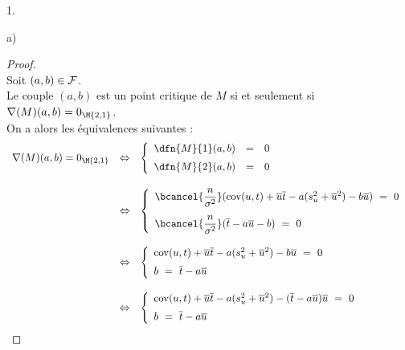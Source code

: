 \begin{noliste}{1.}
\begin{noliste}{a)}
  \begin{proof}~\\
   Soit $(a,b) \in {\cal F}$.\\
   Le couple $(a,b)$ est un point critique de $M$ si et 
    seulement si $\nabla(M)(a,b) = 0_{\M{2,1}}$.\\
    On a alors les équivalences suivantes :
    \[
     \begin{array}{rcl}
      \nabla(M)(a,b) = 0_{\M{2,1}} & \Leftrightarrow &
      \left\{
      \begin{array}{rcl}
        \dfn{M}{1}(a,b) &=& 0\\[.2cm]
        \dfn{M}{2}(a,b) &=& 0
      \end{array}
    \right. 
    \\[.8cm]
    & \Leftrightarrow &
    \left\{
      \begin{array}{l}
        \bcancel{\dfrac{n}{\sigma^2}}(\text{cov}(u,t) + 
	\overline{u}\overline{t} - a(s_u^2 + 
	\overline{u}^2)-b\overline{u}) \ = \ 0
        \\[.4cm]
        \bcancel{\dfrac{n}{\sigma^2}}(\overline{t}-a\overline{u}-b)
        \ = \ 0
      \end{array}
     \right.
     \\[1cm]
     & \Leftrightarrow &
    \left\{
      \begin{array}{l}
        \text{cov}(u,t)+\overline{u}\overline{t}-a(s_u^2
        +\overline{u}^2)-b\overline{u} 
        \ = \ 0 
        \\[.2cm]
        b \ = \ \overline{t}-a\overline{u}
      \end{array}
     \right.
     \\[.8cm]
    & \Leftrightarrow &
    \left\{
      \begin{array}{l}
        \text{cov}(u,t)+\overline{u}\overline{t}-a(s_u^2
        +\overline{u}^2)-(\overline{t}-a\overline{u})\overline{u} 
        \ = \ 0 
        \\[.2cm]
        b \ = \ \overline{t}-a\overline{u}
      \end{array}
     \right.
     \end{array}
    \]
    

\end{proof}
\end{noliste}
\end{noliste}
